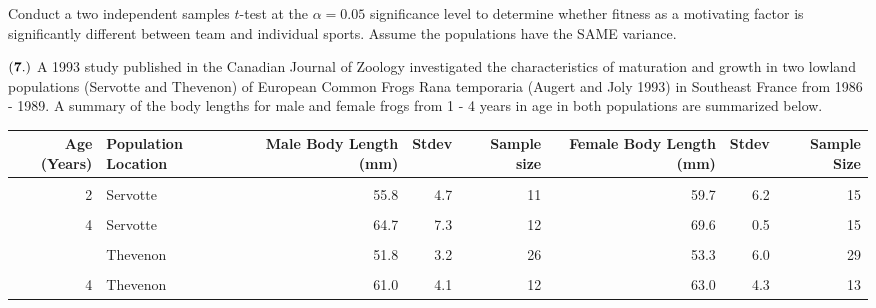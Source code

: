 \documentclass[
]{article}
\begin{document}
Conduct a two independent samples \(t\)-test at the \(\alpha = 0.05\)
significance level to determine whether fitness as a motivating factor
is significantly different between team and individual sports. Assume
the populations have the SAME variance.

\(\bf (7.)\) A 1993 study published in the Canadian Journal of Zoology
investigated the characteristics of maturation and growth in two lowland
populations (Servotte and Thevenon) of European Common Frogs Rana
temporaria (Augert and Joly 1993) in Southeast France from 1986 - 1989.
A summary of the body lengths for male and female frogs from 1 - 4 years
in age in both populations are summarized below.

\begin{table}[H]
\centering\centering
\begin{tabular}{rlrrrrrr}
\toprule
Age (Years) & Population Location & Male Body Length (mm) & Stdev & Sample size & Female Body Length (mm) & Stdev & Sample Size\\
\midrule
\cellcolor{gray!10}{1} & \cellcolor{gray!10}{Servotte} & \cellcolor{gray!10}{32.5} & \cellcolor{gray!10}{5.3} & \cellcolor{gray!10}{45} & \cellcolor{gray!10}{33.4} & \cellcolor{gray!10}{5.4} & \cellcolor{gray!10}{76}\\
2 & Servotte & 55.8 & 4.7 & 11 & 59.7 & 6.2 & 15\\
\cellcolor{gray!10}{3} & \cellcolor{gray!10}{Servotte} & \cellcolor{gray!10}{61.2} & \cellcolor{gray!10}{5.3} & \cellcolor{gray!10}{35} & \cellcolor{gray!10}{65.6} & \cellcolor{gray!10}{5.2} & \cellcolor{gray!10}{27}\\
4 & Servotte & 64.7 & 7.3 & 12 & 69.6 & 0.5 & 15\\
\cellcolor{gray!10}{1} & \cellcolor{gray!10}{Thevenon} & \cellcolor{gray!10}{32.9} & \cellcolor{gray!10}{3.9} & \cellcolor{gray!10}{49} & \cellcolor{gray!10}{32.8} & \cellcolor{gray!10}{4.3} & \cellcolor{gray!10}{76}\\
\addlinespace
2 & Thevenon & 51.8 & 3.2 & 26 & 53.3 & 6.0 & 29\\
\cellcolor{gray!10}{3} & \cellcolor{gray!10}{Thevenon} & \cellcolor{gray!10}{59.9} & \cellcolor{gray!10}{5.4} & \cellcolor{gray!10}{27} & \cellcolor{gray!10}{59.9} & \cellcolor{gray!10}{6.4} & \cellcolor{gray!10}{21}\\
4 & Thevenon & 61.0 & 4.1 & 12 & 63.0 & 4.3 & 13\\
\bottomrule
\end{tabular}
\end{table}
\end{document}
